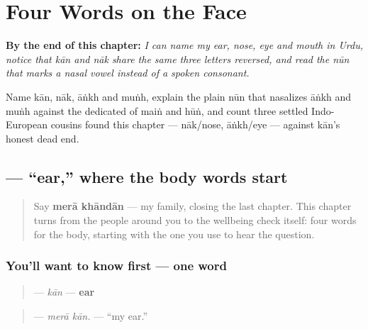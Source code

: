 
\chapter{Four Words on the Face}
\label{ch:ur-face-words}

\begin{chapteropening}
\textbf{By the end of this chapter:} \emph{I can name my ear, nose, eye and mouth in Urdu, notice that kān and nāk share the same three letters reversed, and read the nūn that marks a nasal vowel instead of a spoken consonant.}

Name kān, nāk, āṅkh and muṅh, explain the plain nūn that nasalizes āṅkh and muṅh against the dedicated  of maiṅ and hūṅ, and count three settled Indo-European cousins found this chapter — nāk/nose, āṅkh/eye — against kān's honest dead end.
\end{chapteropening}

\section[\texorpdfstring{\ur{کان} (kān)}{کان (kān)}]{ — \textquotedblleft{}ear,\textquotedblright{} where the body words start}

\label{lesson:UR-C10-kaan}



\begin{quote}
Say \textbf{merā khāndān} — my family, closing the last chapter. This chapter turns from the people around you to the wellbeing check itself: four words for the body, starting with the one you use to hear the question.
\end{quote}

\subsection*{You'll want to know first — one word}
\begin{quote}
\textbf{} — \emph{kān} — \textbf{ear}
\end{quote}

\begin{quote}
\textbf{ } — \emph{merā kān.} — \textquotedblleft{}my ear.\textquotedblright{}
\end{quote}

